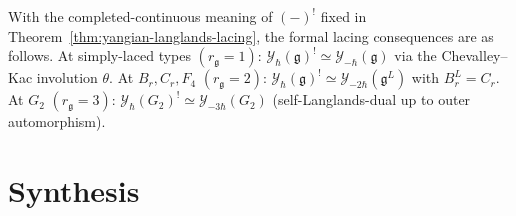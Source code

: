 \begin{corollary}
With the completed-continuous meaning of $(-)^!$ fixed in
Theorem~\textup{\ref{thm:yangian-langlands-lacing}}, the formal
lacing consequences are as follows.
At simply-laced types $(r_{\mathfrak{g}} = 1)$:
$\mathcal{Y}_{\hbar}(\mathfrak{g})^{!} \simeq \mathcal{Y}_{-\hbar}(\mathfrak{g})$
via the Chevalley--Kac involution $\theta$. At $B_r, C_r, F_4$
$(r_{\mathfrak{g}} = 2)$:
$\mathcal{Y}_{\hbar}(\mathfrak{g})^{!} \simeq \mathcal{Y}_{-2\hbar}(\mathfrak{g}^L)$
with $B_r^L = C_r$. At $G_2$ $(r_{\mathfrak{g}} = 3)$:
$\mathcal{Y}_{\hbar}(G_2)^{!} \simeq \mathcal{Y}_{-3\hbar}(G_2)$
(self-Langlands-dual up to outer automorphism).
\end{corollary}

\section{Synthesis}
\label{sec:yangfnd-supplement}

